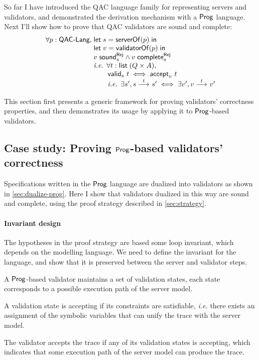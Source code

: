 So far I have introduced the QAC language family for representing servers and
validators, and demonstrated the derivation mechanism with a $\mathsf{Prog}$ language.
Next I'll show how to prove that QAC validators are sound and complete:
\[\begin{array}{r@{\;}l}
\forall p:\Lang,&\letin{s}{\serverOf(p)}\\
&\letin{v}{\validatorOf(p)}\\
&\rejSound v s\wedge\rejComplete v s\\
&\text{\it i.e. }\forall t:\List(Q\times A),\\
&\qquad\valid s t\iff\accepts v t\\
&\qquad\text{\it i.e. }\exists s',\behaves s t s'\iff\exists v',\behaves v t v'
\end{array}\]

This section first presents a generic framework for proving validators'
correctness properties, and then demonstrates its usage by applying it to
$\mathsf{Prog}$-based validators.


\subsection{Case study: Proving $\mathsf{Prog}$-based validators' correctness}
Specifications written in the $\mathsf{Prog}$ language are dualized into validators as
shown in \autoref{sec:dualize-prog}.  Here I show that validators dualized in
this way are sound and complete, using the proof strategy described
in \autoref{sec:strategy}.

\paragraph{Invariant design}
The hypotheses in the proof strategy are based some loop invariant, which
depends on the modelling language.  We need to define the invariant for the
language, and show that it is preserved between the server and validator steps.

A $\mathsf{Prog}$-based validator maintains a set of validation states, each state
corresponds to a possible execution path of the server model.

A validation state is accepting if its constraints are satisfiable, {\it i.e.}
there exists an assignment of the symbolic variables that can unify the trace
with the server model.

The validator accepts the trace if any of its validation states is accepting,
which indicates that some execution path of the server model can produce the
trace.


